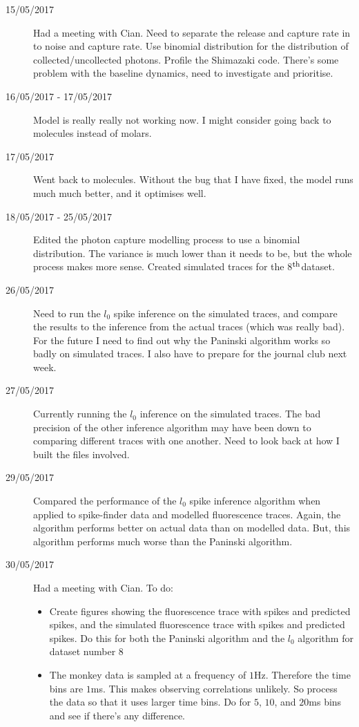 \documentclass[a4paper,12pt]{article}
\theoremstyle{definition}
\newcommand{\upperth}{$^{\mbox{\footnotesize{th}}}$}%
\begin{document}
\begin{description}
	\item[15/05/2017] Had a meeting with Cian. Need to separate the release and capture rate in to noise and capture rate. Use binomial distribution for the distribution of collected/uncollected photons. Profile the Shimazaki code. There's some problem with the baseline dynamics, need to investigate and prioritise.

	\item[16/05/2017 - 17/05/2017] Model is really really not working now. I might consider going back to molecules instead of molars.

	\item[17/05/2017] Went back to molecules. Without the bug that I have fixed, the model runs much much better, and it optimises well.

	\item[18/05/2017 - 25/05/2017] Edited the photon capture modelling process to use a binomial distribution. The variance is much lower than it needs to be, but the whole process makes more sense. Created simulated traces for the 8\upperth dataset.

	\item[26/05/2017] Need to run the $l_0$ spike inference on the simulated traces, and compare the results to the inference from the actual traces (which was really bad). For the future I need to find out why the Paninski algorithm works so badly on simulated traces. I also have to prepare for the journal club next week.

	\item[27/05/2017] Currently running the $l_0$ inference on the simulated traces. The bad precision of the other inference algorithm may have been down to comparing different traces with one another. Need to look back at how I built the files involved.

	\item[29/05/2017] Compared the performance of the $l_0$ spike inference algorithm when applied to spike-finder data and modelled fluorescence traces. Again, the algorithm performs better on actual data than on modelled data. But, this algorithm performs much worse than the Paninski algorithm.

	\item[30/05/2017] Had a meeting with Cian. To do:
	\begin{itemize}
		\item Create figures showing the fluorescence trace with spikes and predicted spikes, and the simulated fluorescence trace with spikes and predicted spikes. Do this for both the Paninski algorithm and the $l_0$ algorithm for dataset number 8
		\item The monkey data is sampled at a frequency of $1$Hz. Therefore the time bins are $1$ms. This makes observing correlations unlikely. So process the data so that it uses larger time bins. Do for $5$, $10$, and $20$ms bins and see if there's any difference.
	\end{itemize}


\end{description}
\end{document}
